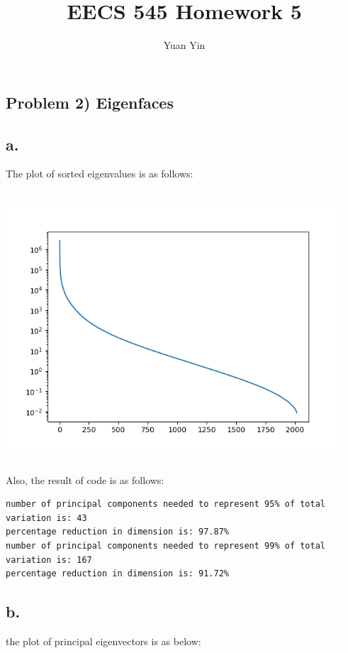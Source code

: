 \documentclass[letterpaper,11pt]{article}
\author{Yuan Yin}
\title{EECS 545 Homework 5}
\begin{document}
\large
\maketitle
\begin{spacing}{1.2}  %
\section*{Problem 2) Eigenfaces}
\subsection*{a.}
The plot of sorted eigenvalues is as follows:

\includegraphics[width=4.95in,height=3.95in]{sorted_eigenvalues.png}

Also, the result of code is as follows:

\begin{lstlisting}
number of principal components needed to represent 95% of total variation is: 43
percentage reduction in dimension is: 97.87%
number of principal components needed to represent 99% of total variation is: 167
percentage reduction in dimension is: 91.72%
\end{lstlisting}

\subsection*{b.}
the plot of principal eigenvectors is as below:


\end{spacing}
\end{document}
